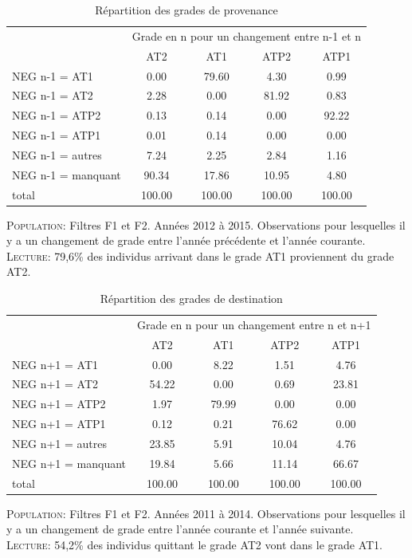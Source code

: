 \documentclass[11pt,a4paper]{article}
\begin{document}
\begin{table}[h!]
\centering
\caption{Répartition des grades de provenance} 
\label{filters}
\begin{tabular}{lcccc}
\toprule
 & \multicolumn{4}{c}{Grade en n pour un changement entre n-1 et n} \\
 & AT2 & AT1 & ATP2 & ATP1 \\ 
  \hline
NEG n-1 = AT1 & 0.00 & 79.60 & 4.30 & 0.99 \\ 
  NEG n-1 = AT2 & 2.28 & 0.00 & 81.92 & 0.83 \\ 
  NEG n-1 = ATP2 & 0.13 & 0.14 & 0.00 & 92.22 \\ 
  NEG n-1 = ATP1 & 0.01 & 0.14 & 0.00 & 0.00 \\ 
  NEG n-1 = autres & 7.24 & 2.25 & 2.84 & 1.16 \\ 
  NEG n-1 = manquant & 90.34 & 17.86 & 10.95 & 4.80 \\ 
  total & 100.00 & 100.00 & 100.00 & 100.00 \\ 
   \hline
\bottomrule
\end{tabular}
\end{table}
\begin{minipage}{12cm}
\footnotesize
\textsc{Population:} Filtres F1 et F2. Années 2012 à 2015. Observations pour lesquelles il y a un changement de grade entre l'année précédente et l'année courante. \\
\textsc{Lecture:} 79,6\% des individus arrivant dans le grade AT1 proviennent du grade AT2.
\end{minipage}


\begin{table}[h!]
\centering
\caption{Répartition des grades de destination} 
\label{filters}
\begin{tabular}{lcccc}
\toprule
 & \multicolumn{4}{c}{Grade en n pour un changement entre n et n+1} \\
 & AT2 & AT1 & ATP2 & ATP1 \\ 
  \hline
NEG n+1 = AT1 & 0.00 & 8.22 & 1.51 & 4.76 \\ 
  NEG n+1 = AT2 & 54.22 & 0.00 & 0.69 & 23.81 \\ 
  NEG n+1 = ATP2 & 1.97 & 79.99 & 0.00 & 0.00 \\ 
  NEG n+1 = ATP1 & 0.12 & 0.21 & 76.62 & 0.00 \\ 
  NEG n+1 = autres & 23.85 & 5.91 & 10.04 & 4.76 \\ 
  NEG n+1 = manquant & 19.84 & 5.66 & 11.14 & 66.67 \\ 
  total & 100.00 & 100.00 & 100.00 & 100.00 \\ 
   \hline
\bottomrule
\end{tabular}
\end{table}
\begin{minipage}{12cm}
\footnotesize
\textsc{Population:} Filtres F1 et F2. Années 2011 à 2014. Observations pour lesquelles il y a un changement de grade entre l'année courante et l'année suivante. \\
\textsc{Lecture:} 54,2\% des individus quittant le grade AT2 vont dans le grade AT1.
\end{minipage}
\end{document}

